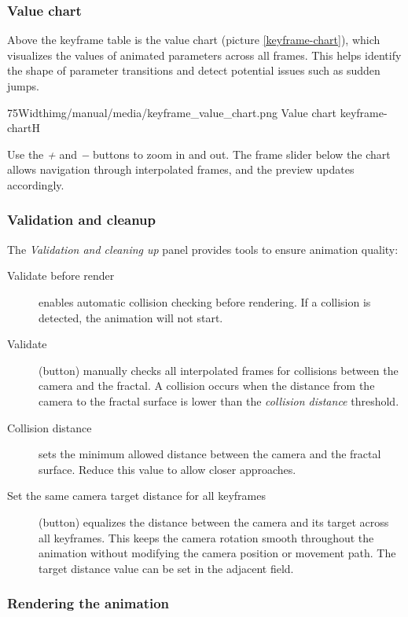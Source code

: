 \subsubsection{Value chart}

Above the keyframe table is the value chart (picture \ref{keyframe-chart}), which visualizes the values of animated parameters across all frames. This helps identify the shape of parameter transitions and detect potential issues such as sudden jumps.

\simpleImageWithCaption75Width{img/manual/media/keyframe_value_chart.png}
{Value chart}
{keyframe-chart}{H}

Use the \emph{+} and \emph{−} buttons to zoom in and out. The frame slider below the chart allows navigation through interpolated frames, and the preview updates accordingly.

\subsubsection{Validation and cleanup}

The \emph{Validation and cleaning up} panel provides tools to ensure animation quality:

\begin{description}
	\item[Validate before render] enables automatic collision checking before rendering. If a collision is detected, the animation will not start.
	
	\item[Validate] (button) manually checks all interpolated frames for collisions between the camera and the fractal. A collision occurs when the distance from the camera to the fractal surface is lower than the \emph{collision distance} threshold.
	
	\item[Collision distance] sets the minimum allowed distance between the camera and the fractal surface. Reduce this value to allow closer approaches.
	
	\item[Set the same camera target distance for all keyframes] (button) equalizes the distance between the camera and its target across all keyframes. This keeps the camera rotation smooth throughout the animation without modifying the camera position or movement path. The target distance value can be set in the adjacent field.
\end{description}

\subsubsection{Rendering the animation}

